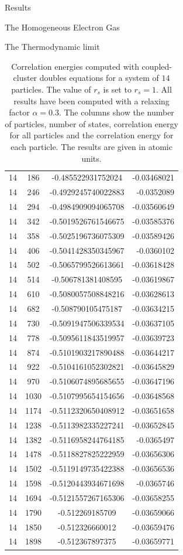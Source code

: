 \documentclass[twoside,english]{uiofysmaster}
\begin{document}
\begin{chapter}{Results}
\begin{section}{The Homogeneous Electron Gas}
\begin{subsection}{The Thermodynamic limit}
\begin{table}[H]
\begin{center}
\begin{tabular}[center]{l  c  c r}
						14 & 186 & -0.485522931752024  & -0.03468021\\
						14 & 246 & -0.4929245740022883 & -0.0352089\\
						14 & 294 & -0.4984909094065708 & -0.03560649\\
						14 & 342 & -0.5019526761546675 & -0.03585376\\
						14 & 358 & -0.5025196736075309 & -0.03589426\\
						14 & 406 & -0.5041428350345967 & -0.0360102\\
						14 & 502 & -0.5065799526613661 & -0.03618428\\
						14 & 514 & -0.506781381408595  & -0.03619867\\
						14 & 610 & -0.5080057508848216 & -0.03628613\\
						14 & 682 & -0.508790105475187  & -0.03634215\\
						14 & 730 & -0.5091947506339534 & -0.03637105\\
						14 & 778 & -0.5095611843519957 & -0.03639723\\
						14 & 874 & -0.5101903217890488 & -0.03644217\\
						14 & 922 & -0.5104161052302821 & -0.03645829\\
						14 & 970 & -0.5106074895685655 & -0.03647196\\
						14 & 1030& -0.5107995654154656 & -0.03648568\\
						14 & 1174& -0.5112320650408912 & -0.03651658\\
						14 & 1238& -0.5113982335227241 & -0.03652845\\
						14 & 1382& -0.5116958244764185 & -0.0365497\\
						14 & 1478& -0.5118827825222959 & -0.03656306\\
						14 & 1502& -0.5119149735422388 & -0.03656536\\
						14 & 1598& -0.5120443934671698 & -0.0365746\\
						14 & 1694& -0.5121557267165306 & -0.03658255\\
						14 & 1790& -0.512269185709 & -0.03659066\\
						14 & 1850& -0.512326660012 & -0.03659476\\
						14 & 1898& -0.512367897375 & -0.03659771\\
					\end{tabular}
				\end{center}
				\caption{Correlation energies computed with coupled-cluster doubles equations for a system of $14$ particles. The value of $r_s$ is set to $r_s=1$. All results have been computed with a relaxing factor $\alpha=0.3$. The columns show the number of particles, number of states, correlation energy for all particles and the correlation energy for each particle. The results are given in atomic units.}
				\label{table:ThermodynamicLimit1}
			\end{table}


\end{subsection}
\end{section}
\end{chapter}
\end{document}
